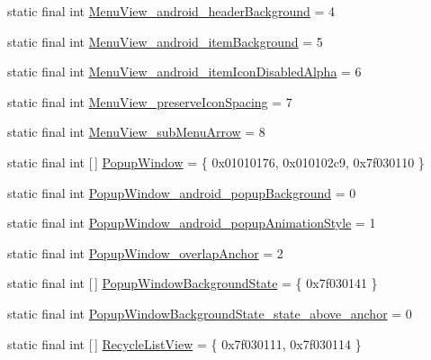 \begin{DoxyCompactItemize}
static final int \mbox{\hyperlink{classandroid_1_1support_1_1v7_1_1appcompat_1_1R_1_1styleable_a2461360be70faed4573a5a5d5119c2ae}{Menu\+View\+\_\+android\+\_\+header\+Background}} = 4
\item 
static final int \mbox{\hyperlink{classandroid_1_1support_1_1v7_1_1appcompat_1_1R_1_1styleable_ac64d11fa342086310618c8e8a1c250fe}{Menu\+View\+\_\+android\+\_\+item\+Background}} = 5
\item 
static final int \mbox{\hyperlink{classandroid_1_1support_1_1v7_1_1appcompat_1_1R_1_1styleable_a0fd3fcba8a2e911a9d2795f2beb7afa3}{Menu\+View\+\_\+android\+\_\+item\+Icon\+Disabled\+Alpha}} = 6
\item 
static final int \mbox{\hyperlink{classandroid_1_1support_1_1v7_1_1appcompat_1_1R_1_1styleable_a075e9c8901b4738d9b5ed561e9c52615}{Menu\+View\+\_\+preserve\+Icon\+Spacing}} = 7
\item 
static final int \mbox{\hyperlink{classandroid_1_1support_1_1v7_1_1appcompat_1_1R_1_1styleable_a31fd7dc1e15bd03702b78af27148af57}{Menu\+View\+\_\+sub\+Menu\+Arrow}} = 8
\item 
static final int \mbox{[}$\,$\mbox{]} \mbox{\hyperlink{classandroid_1_1support_1_1v7_1_1appcompat_1_1R_1_1styleable_abfcd5394a28e12e51efa5ac509687b26}{Popup\+Window}} = \{ 0x01010176, 0x010102c9, 0x7f030110 \}
\item 
static final int \mbox{\hyperlink{classandroid_1_1support_1_1v7_1_1appcompat_1_1R_1_1styleable_ac7f68e4984b94e3ebac98c9575349188}{Popup\+Window\+\_\+android\+\_\+popup\+Background}} = 0
\item 
static final int \mbox{\hyperlink{classandroid_1_1support_1_1v7_1_1appcompat_1_1R_1_1styleable_ae0a82754ab558f4a8c1da94ff395a68d}{Popup\+Window\+\_\+android\+\_\+popup\+Animation\+Style}} = 1
\item 
static final int \mbox{\hyperlink{classandroid_1_1support_1_1v7_1_1appcompat_1_1R_1_1styleable_aee90697b851a641b8011c700b5153ffc}{Popup\+Window\+\_\+overlap\+Anchor}} = 2
\item 
static final int \mbox{[}$\,$\mbox{]} \mbox{\hyperlink{classandroid_1_1support_1_1v7_1_1appcompat_1_1R_1_1styleable_af780db5a661b33d826f07231dfde13ec}{Popup\+Window\+Background\+State}} = \{ 0x7f030141 \}
\item 
static final int \mbox{\hyperlink{classandroid_1_1support_1_1v7_1_1appcompat_1_1R_1_1styleable_a0288416ef672e1d476c6407516b89ee5}{Popup\+Window\+Background\+State\+\_\+state\+\_\+above\+\_\+anchor}} = 0
\item 
static final int \mbox{[}$\,$\mbox{]} \mbox{\hyperlink{classandroid_1_1support_1_1v7_1_1appcompat_1_1R_1_1styleable_ad497ba96526376d2bb2a9cf4efa0e91d}{Recycle\+List\+View}} = \{ 0x7f030111, 0x7f030114 \}

\end{DoxyCompactItemize}
